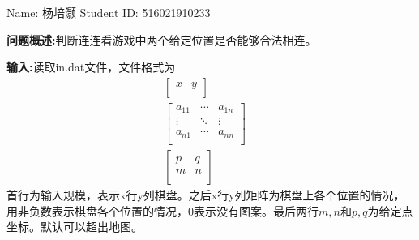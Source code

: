 \documentclass[12pt,a4paper]{article}
\theoremstyle{definition}
\begin{document}
\noindent

\noindent{}
\begin{center}
\footnotesize{\color{black} Name: 杨培灏  \quad Student ID: 516021910233}
\end{center}

\textbf{问题概述:}判断连连看游戏中两个给定位置是否能够合法相连。

\textbf{输入:}读取in.dat文件，文件格式为
\begin{gather*}
\begin{bmatrix}
x & y\\
\end{bmatrix}\quad\\
\begin{bmatrix}
a_{11}&\cdots&a_{1n}\\
\vdots&\ddots&\vdots\\
a_{n1}&\cdots&a_{nn}\\
\end{bmatrix}\quad\\
\begin{bmatrix}
p & q\\
m & n\\
\end{bmatrix}
\end{gather*}
首行为输入规模，表示x行y列棋盘。之后x行y列矩阵为棋盘上各个位置的情况，用非负数表示棋盘各个位置的情况，0表示没有图案。最后两行$m,n$和$p,q$为给定点坐标。默认可以超出地图。
\end{document}
